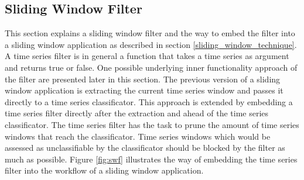\subsection{Sliding Window Filter} \label{sliding_window_filter}
This section explains a sliding window filter and the way to embed the filter into a sliding window application as
described in section \ref{sliding_window_technique}. A time series filter is in general a function that takes a time
series as argument and returns true or false. One possible underlying inner functionality approach of the filter are
presented later in this section. The previous version of a sliding window application is extracting the current time
series window and passes it directly to a time series classificator. This approach is extended by embedding a time
series filter directly after the extraction and ahead of the time series classificator. The time series filter has the
task to prune the amount of time series windows that reach the classificator. Time series windows which would be
assessed as unclassifiable by the classificator should be blocked by the filter as much as possible. Figure
\ref{fig:swf} illustrates the way of embedding the time series filter into the workflow of a sliding window application.

